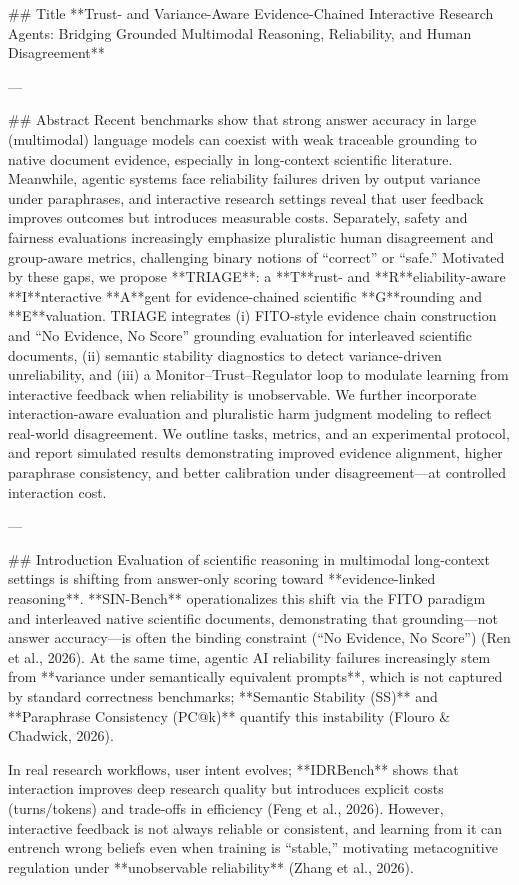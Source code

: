 ## Title  
**Trust- and Variance-Aware Evidence-Chained Interactive Research Agents: Bridging Grounded Multimodal Reasoning, Reliability, and Human Disagreement**

---

## Abstract  
Recent benchmarks show that strong answer accuracy in large (multimodal) language models can coexist with weak traceable grounding to native document evidence, especially in long-context scientific literature. Meanwhile, agentic systems face reliability failures driven by output variance under paraphrases, and interactive research settings reveal that user feedback improves outcomes but introduces measurable costs. Separately, safety and fairness evaluations increasingly emphasize pluralistic human disagreement and group-aware metrics, challenging binary notions of “correct” or “safe.” Motivated by these gaps, we propose **TRIAGE**: a **T**rust- and **R**eliability-aware **I**nteractive **A**gent for evidence-chained scientific **G**rounding and **E**valuation. TRIAGE integrates (i) FITO-style evidence chain construction and “No Evidence, No Score” grounding evaluation for interleaved scientific documents, (ii) semantic stability diagnostics to detect variance-driven unreliability, and (iii) a Monitor–Trust–Regulator loop to modulate learning from interactive feedback when reliability is unobservable. We further incorporate interaction-aware evaluation and pluralistic harm judgment modeling to reflect real-world disagreement. We outline tasks, metrics, and an experimental protocol, and report simulated results demonstrating improved evidence alignment, higher paraphrase consistency, and better calibration under disagreement—at controlled interaction cost.

---

## Introduction  
Evaluation of scientific reasoning in multimodal long-context settings is shifting from answer-only scoring toward **evidence-linked reasoning**. **SIN-Bench** operationalizes this shift via the FITO paradigm and interleaved native scientific documents, demonstrating that grounding—not answer accuracy—is often the binding constraint (“No Evidence, No Score”) (Ren et al., 2026). At the same time, agentic AI reliability failures increasingly stem from **variance under semantically equivalent prompts**, which is not captured by standard correctness benchmarks; **Semantic Stability (SS)** and **Paraphrase Consistency (PC@k)** quantify this instability (Flouro & Chadwick, 2026).  

In real research workflows, user intent evolves; **IDRBench** shows that interaction improves deep research quality but introduces explicit costs (turns/tokens) and trade-offs in efficiency (Feng et al., 2026). However, interactive feedback is not always reliable or consistent, and learning from it can entrench wrong beliefs even when training is “stable,” motivating metacognitive regulation under **unobservable reliability** (Zhang et al., 2026).  

